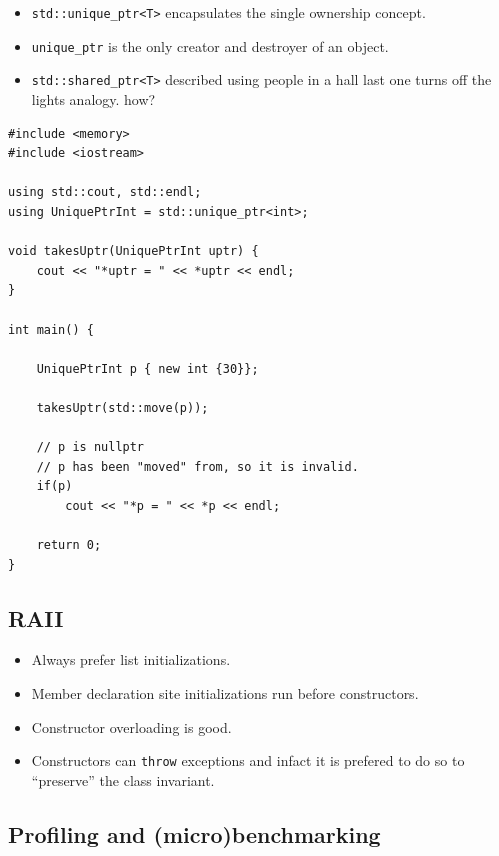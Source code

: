\documentclass[a4paper]{article}
\begin{document}
\lstset{style=custom-cpp}
% 

\begin{itemize}
    \item \lstinline{std::unique_ptr<T>} encapsulates the single ownership concept.
    \item \lstinline{unique_ptr} is the only creator and destroyer of an object.
    \item \lstinline{std::shared_ptr<T>} described using people in a hall last one turns off the lights analogy. how?
\end{itemize}

\begin{lstlisting}
#include <memory>
#include <iostream>

using std::cout, std::endl;
using UniquePtrInt = std::unique_ptr<int>;

void takesUptr(UniquePtrInt uptr) {
    cout << "*uptr = " << *uptr << endl;
}

int main() {
    
    UniquePtrInt p { new int {30}};

    takesUptr(std::move(p));

    // p is nullptr
    // p has been "moved" from, so it is invalid.
    if(p)
        cout << "*p = " << *p << endl;

    return 0;
}
\end{lstlisting}

\subsection*{RAII}

\begin{itemize}
    \item Always prefer list initializations.
    \item Member declaration site initializations run before constructors.
    \item Constructor overloading is good.
    \item Constructors can \lstinline{throw} exceptions and infact it is prefered to do so to ``preserve'' the class invariant.
\end{itemize}

\subsection*{Profiling and (micro)benchmarking}
\end{document}
